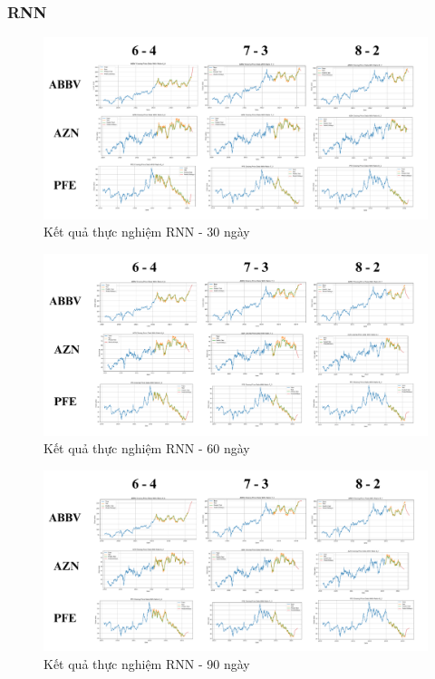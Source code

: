 \documentclass[conference]{IEEEtran}
\begin{document}
\subsubsection{RNN}
\begin{figure}[H]
    \centering
    \begin{minipage}{0.5\textwidth}
    \centering
    \includegraphics[width=1\textwidth]{Image/RNN30.png}
    \caption{Kết quả thực nghiệm RNN - 30 ngày}
    \label{fig:1}
    \end{minipage}
\end{figure}
\begin{figure}[H]
    \centering
    \begin{minipage}{0.5\textwidth}
    \centering
    \includegraphics[width=1\textwidth]{Image/RNN60.png}
    \caption{Kết quả thực nghiệm RNN - 60 ngày}
    \label{fig:1}
    \end{minipage}
\end{figure}
\begin{figure}[H]
    \centering
    \begin{minipage}{0.5\textwidth}
    \centering
    \includegraphics[width=1\textwidth]{Image/RNN90.png}
    \caption{Kết quả thực nghiệm RNN - 90 ngày}
    \label{fig:1}
    \end{minipage}
\end{figure}
\end{document}
